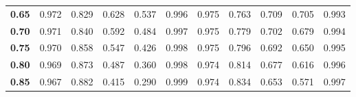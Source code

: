 \begin{table}
\begin{small}
\begin{tabular}{l|l|l|l|l|l|l|l|l|l|l}
    \cellcolor[HTML]{EFEFEF}\textbf{0.65}   & \cellcolor[HTML]{FFEEEE}0.972                 & \cellcolor[HTML]{FFEEEE}0.829               & \cellcolor[HTML]{FFEEEE}0.628                     & \cellcolor[HTML]{FFEEEE}0.537                    & \cellcolor[HTML]{FFEEEE}0.996                 & \cellcolor[HTML]{EEFFEE}0.975                 & \cellcolor[HTML]{EEFFEE}0.763               & \cellcolor[HTML]{EEFFEE}0.709                    & \cellcolor[HTML]{EEFFEE}0.705                    & \cellcolor[HTML]{EEFFEE}0.993                       \\ \cline{1-11}
    \cellcolor[HTML]{EFEFEF}\textbf{0.70}   & \cellcolor[HTML]{FFEEEE}0.971                 & \cellcolor[HTML]{FFEEEE}0.840               & \cellcolor[HTML]{FFEEEE}0.592                     & \cellcolor[HTML]{FFEEEE}0.484                    & \cellcolor[HTML]{FFEEEE}0.997                 & \cellcolor[HTML]{EEFFEE}0.975                 & \cellcolor[HTML]{EEFFEE}0.779               & \cellcolor[HTML]{EEFFEE}0.702                    & \cellcolor[HTML]{EEFFEE}0.679                    & \cellcolor[HTML]{EEFFEE}0.994                       \\ \cline{1-11}
    \cellcolor[HTML]{EFEFEF}\textbf{0.75}   & \cellcolor[HTML]{FFEEEE}0.970                 & \cellcolor[HTML]{FFEEEE}0.858               & \cellcolor[HTML]{FFEEEE}0.547                     & \cellcolor[HTML]{FFEEEE}0.426                    & \cellcolor[HTML]{FFEEEE}0.998                 & \cellcolor[HTML]{EEFFEE}0.975                 & \cellcolor[HTML]{EEFFEE}0.796               & \cellcolor[HTML]{EEFFEE}0.692                    & \cellcolor[HTML]{EEFFEE}0.650                    & \cellcolor[HTML]{EEFFEE}0.995                       \\ \cline{1-11} 
    \cellcolor[HTML]{EFEFEF}\textbf{0.80}   & \cellcolor[HTML]{FFEEEE}0.969                 & \cellcolor[HTML]{FFEEEE}0.873               & \cellcolor[HTML]{FFEEEE}0.487                     & \cellcolor[HTML]{FFEEEE}0.360                    & \cellcolor[HTML]{FFEEEE}0.998                 & \cellcolor[HTML]{EEFFEE}0.974                 & \cellcolor[HTML]{EEFFEE}0.814               & \cellcolor[HTML]{EEFFEE}0.677                    & \cellcolor[HTML]{EEFFEE}0.616                    & \cellcolor[HTML]{EEFFEE}0.996                       \\ \cline{1-11}
    \cellcolor[HTML]{EFEFEF}\textbf{0.85}   & \cellcolor[HTML]{FFEEEE}0.967                 & \cellcolor[HTML]{FFEEEE}0.882               & \cellcolor[HTML]{FFEEEE}0.415                     & \cellcolor[HTML]{FFEEEE}0.290                    & \cellcolor[HTML]{FFEEEE}0.999                 & \cellcolor[HTML]{EEFFEE}0.974                 & \cellcolor[HTML]{EEFFEE}0.834               & \cellcolor[HTML]{EEFFEE}0.653                    & \cellcolor[HTML]{EEFFEE}0.571                    & \cellcolor[HTML]{EEFFEE}0.997                       \\ \cline{1-11}

\end{tabular}
\end{small}
\end{table}
